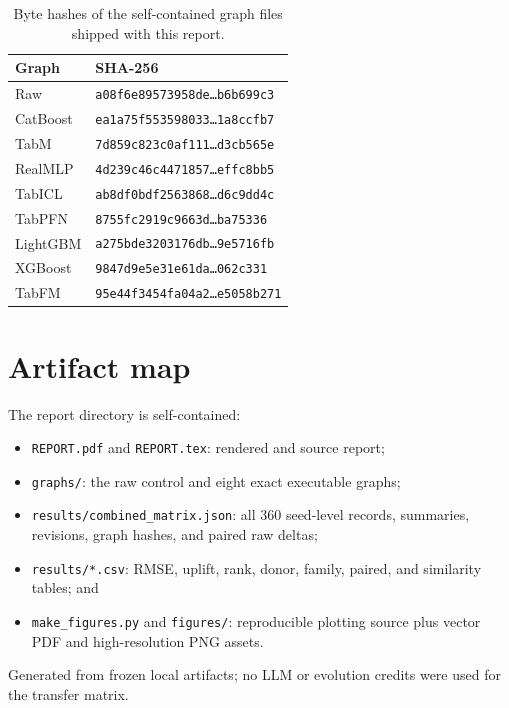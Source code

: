 \documentclass[10pt]{article}
\newcommand{\code}[1]{\texttt{#1}}
\begin{document}
\begin{table}[H]
\centering
\small
\begin{tabular}{ll}
\toprule
Graph & SHA-256 \\
\midrule
Raw      & \code{a08f6e89573958de\ldots b6b699c3} \\
CatBoost & \code{ea1a75f553598033\ldots 1a8ccfb7} \\
TabM     & \code{7d859c823c0af111\ldots d3cb565e} \\
RealMLP  & \code{4d239c46c4471857\ldots effc8bb5} \\
TabICL   & \code{ab8df0bdf2563868\ldots d6c9dd4c} \\
TabPFN   & \code{8755fc2919c9663d\ldots ba75336} \\
LightGBM & \code{a275bde3203176db\ldots 9e5716fb} \\
XGBoost  & \code{9847d9e5e31e61da\ldots 062c331} \\
TabFM    & \code{95e44f3454fa04a2\ldots e5058b271} \\
\bottomrule
\end{tabular}
\caption{Byte hashes of the self-contained graph files shipped with this
report.}
\end{table}

\section*{Artifact map}

The report directory is self-contained:

\begin{itemize}
  \item \code{REPORT.pdf} and \code{REPORT.tex}: rendered and source report;
  \item \code{graphs/}: the raw control and eight exact executable graphs;
  \item \code{results/combined\_matrix.json}: all 360 seed-level records,
  summaries, revisions, graph hashes, and paired raw deltas;
  \item \code{results/*.csv}: RMSE, uplift, rank, donor, family, paired, and
  similarity tables; and
  \item \code{make\_figures.py} and \code{figures/}: reproducible plotting
  source plus vector PDF and high-resolution PNG assets.
\end{itemize}

\vfill
\begin{center}
\small\color{muted}
Generated from frozen local artifacts; no LLM or evolution credits were used
for the transfer matrix.
\end{center}
\end{document}
